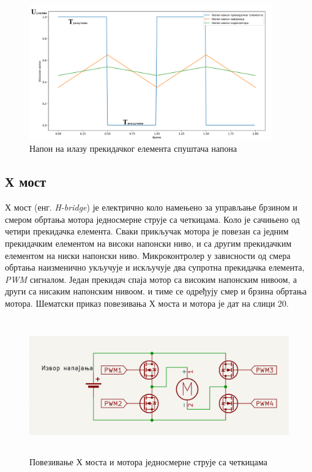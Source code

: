 \documentclass{article}
\begin{document}
\begin{figure}[H]
\centering
\includegraphics[height=2.3in]{Images/PWM.png }
\caption{Напон на илазу прекидачког елемента спуштача напона}
\label{fig:figure19}
\end{figure}
\clearpage

\subsection{Х мост}
Х мост (енг. \textit{H-bridge}) је електрично коло намењено за управљање брзином и смером обртања мотора једносмерне струје са четкицама. Коло је сачињено од четири прекидачка елемента. Сваки прикључак мотора је повезан са једним прекидачким елементом на високи напонски ниво, и са другим прекидачким елементом на ниски напонски ниво. Микроконтролер у зависности од смера обртања наизменично укључује и искључује два супротна прекидачка елемента, \textit{PWM} сигналом. Један прекидач спаја мотор са високим напонским нивоом, а други са нисаким напонским нивоом. и тиме се одређују смер и брзина обртања мотора. Шематски приказ повезивања Х моста и мотора је дат на слици 20.

\begin{figure}[H]
\centering
\includegraphics[height=2.3in]{Images/H_most.png }
\caption{Повезивање Х моста и мотора једносмерне струје са четкицама}
\label{fig:figure20}
\end{figure}
\clearpage

\printbibliography
\clearpage



\end{document}
